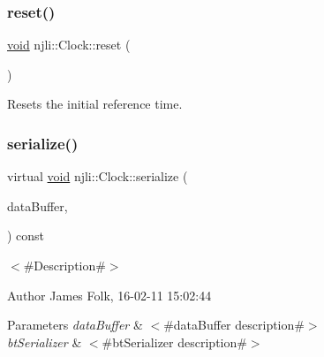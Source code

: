 \mbox{\label{classnjli_1_1_clock_ad318ac6f8c34fa8796dfe6156cbb1824}} 
\subsubsection{\texorpdfstring{reset()}{reset()}}
{\footnotesize\ttfamily \mbox{\hyperlink{_thread_8h_af1e856da2e658414cb2456cb6f7ebc66}{void}} njli\+::\+Clock\+::reset (\begin{DoxyParamCaption}{ }\end{DoxyParamCaption})}



Resets the initial reference time. 

\mbox{\label{classnjli_1_1_clock_a8c6f081b125f65ae45ee0bfd7ef85138}} 
\subsubsection{\texorpdfstring{serialize()}{serialize()}}
{\footnotesize\ttfamily virtual \mbox{\hyperlink{_thread_8h_af1e856da2e658414cb2456cb6f7ebc66}{void}} njli\+::\+Clock\+::serialize (\begin{DoxyParamCaption}\item[{\mbox{\hyperlink{_thread_8h_af1e856da2e658414cb2456cb6f7ebc66}{void}} $\ast$}]{data\+Buffer,  }\item[{bt\+Serializer $\ast$}]{ }\end{DoxyParamCaption}) const\hspace{0.3cm}{\ttfamily [virtual]}}



$<$\#\+Description\#$>$ 

\begin{DoxyAuthor}{Author}
James Folk, 16-\/02-\/11 15\+:02\+:44
\end{DoxyAuthor}

\begin{DoxyParams}{Parameters}
{\em data\+Buffer} & $<$\#data\+Buffer description\#$>$ \\
\hline
{\em bt\+Serializer} & $<$\#bt\+Serializer description\#$>$ \\
\hline
\end{DoxyParams}


